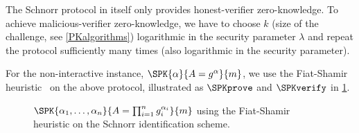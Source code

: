 The Schnorr protocol in itself only provides honest-verifier zero-knowledge.
To achieve malicious-verifier zero-knowledge, we have to choose \(k\) (size of 
the challenge, see \cref{PKalgorithms}) logarithmic in the security parameter 
\(\lambda\) and repeat the protocol sufficiently many times (also logarithmic in 
the security parameter).


For the non-interactive instance, \(\SPK{\alpha}{A = g^\alpha}{m}\), we use the 
Fiat-Shamir heuristic~\cite{FiatShamirHeuristic} on the above protocol, 
illustrated as \(\SPKprove\) and \(\SPKverify\) in \cref{SPKalgorithms}.

\begin{figure*}
  \begin{minipage}[t]{0.49\linewidth}
    \begin{algorithmic}
        \EndFor{}
      \EndFunction{}
    \end{algorithmic}
  \end{minipage}
  \hfill
  \begin{minipage}[t]{0.49\linewidth}
    \begin{algorithmic}
        \Else{}
        \EndIf{}
      \EndFunction{}
    \end{algorithmic}
  \end{minipage}
  \caption{%
    \(\SPK{\alpha_1, \dotsc, \alpha_n}{A = \prod_{i=1}^n g_i^{\alpha_i}}{m}\) 
    using the Fiat-Shamir heuristic on the Schnorr identification scheme.
  }%
  \label{SPKalgorithms}
\end{figure*}
